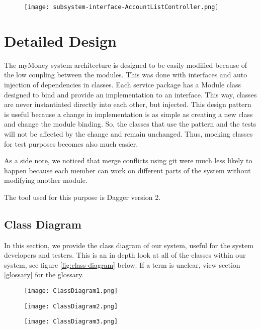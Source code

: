\documentclass[12pt]{article}
\begin{document}
\begin{figure}[H]
\texttt{[image: subsystem-interface-AccountListController.png]}
\end{figure}

\clearpage

\section{Detailed Design} \label{sec:detail}

The myMoney system architecture is designed to be easily modified because of the low coupling between the modules. This was done with interfaces and auto injection of dependencies in classes. Each service package has a Module class designed to bind and provide an implementation to an interface. This way, classes are never instantiated directly into each other, but injected. This design pattern is useful because a change in implementation is as simple as creating a new class and change the module binding. So, the classes that use the pattern and the tests will not be affected by the change and remain unchanged. Thus, mocking classes for test purposes becomes also much easier.

As a side note, we noticed that merge conflicts using git were much less likely to happen because each member can work on different parts of the system without modifying another module.

The tool used for this purpose is Dagger version 2.

\subsection{Class Diagram}

In this section, we provide the class diagram of our system, useful for the system developers and testers. This is an in depth look at all of the classes within our system, see figure \ref{fig:class-diagram} below. If a term is unclear, view section \ref{glossary} for the glossary.

\begin{figure}[H]
\texttt{[image: ClassDiagram1.png]}
\end{figure}

\begin{figure}[H]
\texttt{[image: ClassDiagram2.png]}
\end{figure}

\begin{figure}[H]
\texttt{[image: ClassDiagram3.png]}
\end{figure}
\end{document}

